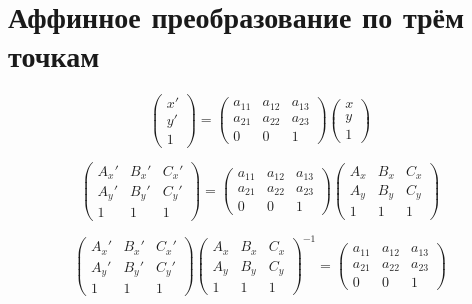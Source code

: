 \section{Аффинное преобразование по трём точкам}

\begin{equation*}
	\begin{pmatrix} x' \\ y' \\ 1 \end{pmatrix}
	= 
	\begin{pmatrix}
		a_{11} & a_{12} & a_{13} \\
		a_{21} & a_{22} & a_{23} \\
		0 & 0 & 1
	\end{pmatrix}
	\begin{pmatrix} x \\ y \\ 1 \end{pmatrix}
\end{equation*}

\begin{equation*}
	\begin{pmatrix} 
		A_x' & B_x' & C_x' \\ 
		A_y' & B_y' & C_y' \\ 
		1 & 1 & 1
	\end{pmatrix}
	= 
	\begin{pmatrix}
		a_{11} & a_{12} & a_{13} \\
		a_{21} & a_{22} & a_{23} \\
		0 & 0 & 1
	\end{pmatrix}
	\begin{pmatrix} 
		A_x & B_x & C_x \\ 
		A_y & B_y & C_y \\ 
		1 & 1 & 1
	\end{pmatrix}
\end{equation*}

\begin{equation*}
	\begin{pmatrix} 
		A_x' & B_x' & C_x' \\ 
		A_y' & B_y' & C_y' \\ 
		1 & 1 & 1
	\end{pmatrix}
	\begin{pmatrix} 
		A_x & B_x & C_x \\ 
		A_y & B_y & C_y \\ 
		1 & 1 & 1
	\end{pmatrix}^{-1}
	= 
	\begin{pmatrix}
		a_{11} & a_{12} & a_{13} \\
		a_{21} & a_{22} & a_{23} \\
		0 & 0 & 1
	\end{pmatrix}
\end{equation*}
